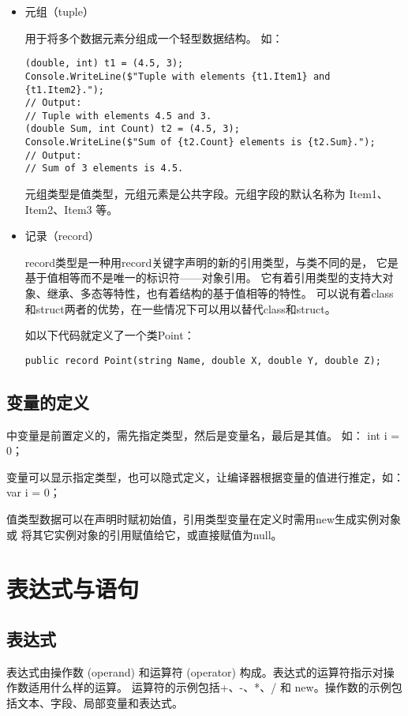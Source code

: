 \begin{itemize}
    \item 元组（tuple）
    
    用于将多个数据元素分组成一个轻型数据结构。
    如：
\begin{lstlisting}
(double, int) t1 = (4.5, 3);
Console.WriteLine($"Tuple with elements {t1.Item1} and {t1.Item2}.");
// Output:
// Tuple with elements 4.5 and 3.
(double Sum, int Count) t2 = (4.5, 3);
Console.WriteLine($"Sum of {t2.Count} elements is {t2.Sum}.");
// Output:
// Sum of 3 elements is 4.5.
\end{lstlisting}

    元组类型是值类型，元组元素是公共字段。元组字段的默认名称为 Item1、Item2、Item3 等。

    \item 记录（record）
    
    record类型是一种用record关键字声明的新的引用类型，与类不同的是，
    它是基于值相等而不是唯一的标识符——对象引用。
    它有着引用类型的支持大对象、继承、多态等特性，也有着结构的基于值相等的特性。
    可以说有着class和struct两者的优势，在一些情况下可以用以替代class和struct。

    如以下代码就定义了一个类Point：
\begin{lstlisting}
public record Point(string Name, double X, double Y, double Z);
\end{lstlisting}

\end{itemize}


\subsection{变量的定义}

\cs 中变量是前置定义的，需先指定类型，然后是变量名，最后是其值。
如： int i = 0；

变量可以显示指定类型，也可以隐式定义，让编译器根据变量的值进行推定，如：
var i = 0；

值类型数据可以在声明时赋初始值，引用类型变量在定义时需用new生成实例对象或
将其它实例对象的引用赋值给它，或直接赋值为null。


\section{表达式与语句}

\subsection{表达式}
表达式由操作数 (operand) 和运算符 (operator) 构成。表达式的运算符指示对操作数适用什么样的运算。
运算符的示例包括+、-、*、/ 和 new。操作数的示例包括文本、字段、局部变量和表达式。

